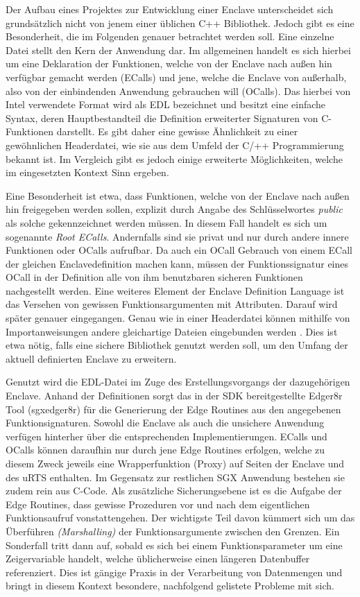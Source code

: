Der Aufbau eines Projektes zur Entwicklung einer Enclave unterscheidet sich grundsätzlich nicht von jenem einer üblichen C++ Bibliothek. Jedoch gibt es eine Besonderheit, die im Folgenden genauer betrachtet werden soll. Eine einzelne Datei stellt den Kern der Anwendung dar. Im allgemeinen handelt es sich hierbei um eine Deklaration der Funktionen, welche von der Enclave nach außen hin verfügbar gemacht werden (\acp{ECall}) und jene, welche die Enclave von außerhalb, also von der einbindenden Anwendung gebrauchen will (\acp{OCall}). Das hierbei von Intel verwendete Format wird als \ac{EDL} bezeichnet und besitzt eine einfache Syntax, deren Hauptbestandteil die Definition erweiterter Signaturen von C-Funktionen darstellt. Es gibt daher eine gewisse Ähnlichkeit zu einer gewöhnlichen Headerdatei, wie sie aus dem Umfeld der C/++ Programmierung bekannt ist. Im Vergleich gibt es jedoch einige erweiterte Möglichkeiten, welche im eingesetzten Kontext Sinn ergeben.

Eine Besonderheit ist etwa, dass Funktionen, welche von der Enclave nach außen hin freigegeben werden sollen, explizit durch Angabe des Schlüsselwortes \textit{public} als solche gekennzeichnet werden müssen. In diesem Fall handelt es sich um sogenannte \textit{Root \acp{ECall}}. Andernfalls sind sie privat und nur durch andere innere Funktionen oder \acp{OCall} aufrufbar. Da auch ein \ac{OCall} Gebrauch von einem \ac{ECall} der gleichen Enclavedefinition machen kann, müssen der Funktionssignatur eines \ac{OCall} in der Definition alle von ihm benutzbaren sicheren Funktionen nachgestellt werden. Eine weiteres Element der Enclave Definition Language ist das Versehen von gewissen Funktionsargumenten mit Attributen. Darauf wird später genauer eingegangen. Genau wie in einer Headerdatei können mithilfe von Importanweisungen andere gleichartige Dateien eingebunden werden \cite{WinDev}. Dies ist etwa nötig, falls eine sichere Bibliothek genutzt werden soll, um den Umfang der aktuell definierten Enclave zu erweitern.

Genutzt wird die \ac{EDL}-Datei im Zuge des Erstellungsvorgangs der dazugehörigen Enclave. Anhand der Definitionen sorgt das in der SDK bereitgestellte Edger8r Tool (sgx\textunderscore edger8r) für die Generierung der Edge Routines aus den angegebenen Funktionsignaturen. Sowohl die Enclave als auch die unsichere Anwendung verfügen hinterher über die entsprechenden Implementierungen. \acp{ECall} und \acp{OCall} können daraufhin nur durch jene Edge Routines erfolgen, welche zu diesem Zweck jeweils eine Wrapperfunktion (Proxy) auf Seiten der Enclave und des \ac{uRTS} enthalten. Im Gegensatz zur restlichen \ac{SGX} Anwendung bestehen sie zudem rein aus C-Code. Als zusätzliche Sicherungsebene ist es die Aufgabe der Edge Routines, dass gewisse Prozeduren vor und nach dem eigentlichen Funktionsaufruf vonstattengehen. Der wichtigste Teil davon kümmert sich um das Überführen \textit{(Marshalling)} der Funktionsargumente zwischen den Grenzen. Ein Sonderfall tritt dann auf, sobald es sich bei einem Funktionsparameter um eine Zeigervariable handelt, welche üblicherweise einen längeren Datenbuffer referenziert. Dies ist gängige Praxis in der Verarbeitung von Datenmengen und bringt in diesem Kontext besondere, nachfolgend gelistete Probleme mit sich.

